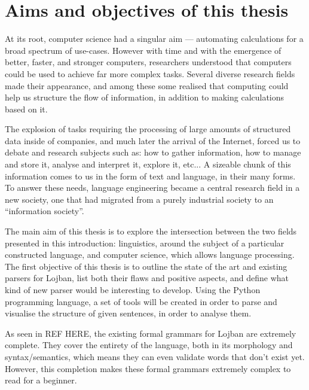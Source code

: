 \chapter{Aims and objectives of this thesis}

At its root, computer science had a singular aim --- automating calculations for a broad spectrum of use-cases.
However with time and with the emergence of better, faster, and stronger computers, researchers understood that computers could be used to achieve
far more complex tasks. Several diverse research fields made their appearance, and among these some realised that computing could help us structure the
flow of information, in addition to making calculations based on it. \newline

The explosion of tasks requiring the processing of large amounts of structured data inside of companies, and much later the arrival of the Internet,
forced us to debate and research subjects such as: how to gather information, how to manage and store it, analyse and interpret it, explore it, etc...
A sizeable chunk of this information comes to us in the form of text and language, in their many forms. To answer these needs, language engineering became a
central research field in a new society, one that had migrated from a purely industrial society to an ``information society''.\newline

The main aim of this thesis is to explore the intersection between the two fields presented in this introduction: linguistics, around the subject of a
particular constructed language, and computer science, which allows language processing. The first objective of this thesis is to outline the state of the
art and existing parsers for Lojban, list both their flaws and positive aspects, and define what kind of new parser would be interesting to develop.
Using the Python programming language, a set of tools will be created in order to parse and visualise the structure of given sentences, in order to analyse them.\newline

As seen in REF HERE, the existing formal grammars for Lojban are extremely complete. They cover the entirety of the language, both in its morphology and syntax/semantics, which means they can even validate words that don't exist yet. However, this completion makes these formal grammars extremely complex to read for a beginner. \\

